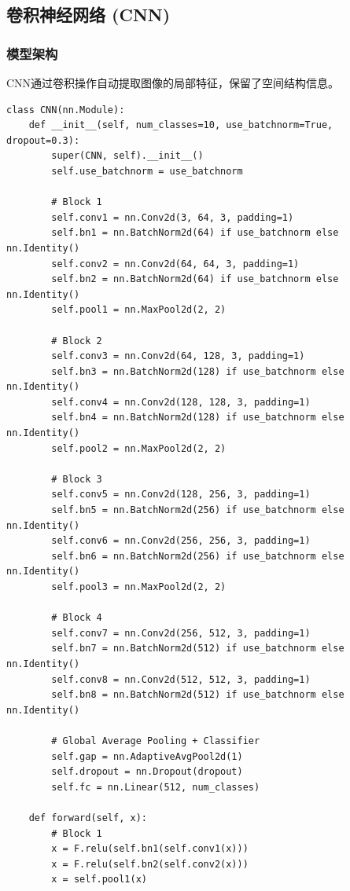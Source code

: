 \documentclass[12pt,a4paper]{article}
\begin{document}
\subsection{卷积神经网络 (CNN)}

\subsubsection{模型架构}

CNN通过卷积操作自动提取图像的局部特征，保留了空间结构信息。

\begin{lstlisting}[caption={CNN模型定义},label={lst:cnn}]
class CNN(nn.Module):
    def __init__(self, num_classes=10, use_batchnorm=True, dropout=0.3):
        super(CNN, self).__init__()
        self.use_batchnorm = use_batchnorm
        
        # Block 1
        self.conv1 = nn.Conv2d(3, 64, 3, padding=1)
        self.bn1 = nn.BatchNorm2d(64) if use_batchnorm else nn.Identity()
        self.conv2 = nn.Conv2d(64, 64, 3, padding=1)
        self.bn2 = nn.BatchNorm2d(64) if use_batchnorm else nn.Identity()
        self.pool1 = nn.MaxPool2d(2, 2)
        
        # Block 2
        self.conv3 = nn.Conv2d(64, 128, 3, padding=1)
        self.bn3 = nn.BatchNorm2d(128) if use_batchnorm else nn.Identity()
        self.conv4 = nn.Conv2d(128, 128, 3, padding=1)
        self.bn4 = nn.BatchNorm2d(128) if use_batchnorm else nn.Identity()
        self.pool2 = nn.MaxPool2d(2, 2)
        
        # Block 3
        self.conv5 = nn.Conv2d(128, 256, 3, padding=1)
        self.bn5 = nn.BatchNorm2d(256) if use_batchnorm else nn.Identity()
        self.conv6 = nn.Conv2d(256, 256, 3, padding=1)
        self.bn6 = nn.BatchNorm2d(256) if use_batchnorm else nn.Identity()
        self.pool3 = nn.MaxPool2d(2, 2)
        
        # Block 4
        self.conv7 = nn.Conv2d(256, 512, 3, padding=1)
        self.bn7 = nn.BatchNorm2d(512) if use_batchnorm else nn.Identity()
        self.conv8 = nn.Conv2d(512, 512, 3, padding=1)
        self.bn8 = nn.BatchNorm2d(512) if use_batchnorm else nn.Identity()
        
        # Global Average Pooling + Classifier
        self.gap = nn.AdaptiveAvgPool2d(1)
        self.dropout = nn.Dropout(dropout)
        self.fc = nn.Linear(512, num_classes)
        
    def forward(self, x):
        # Block 1
        x = F.relu(self.bn1(self.conv1(x)))
        x = F.relu(self.bn2(self.conv2(x)))
        x = self.pool1(x)
        

\end{lstlisting}
\end{document}

